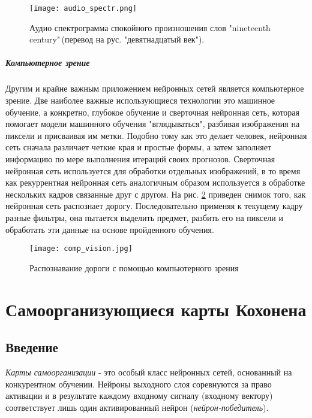 \documentclass[a4paper,12pt]{report}
\begin{document}
\begin{figure}[!htb]
    \centering
    \captionsetup{justification=centering}
    \texttt{[image: audio\_spectr.png]}
    \caption{Аудио спектрограмма спокойного произношения слов
    "nineteenth century"\,(перевод на рус. "девятнадцатый век").}
    \label{fig:audio_spectr}
\end{figure}


\paragraph{Компьютерное зрение}
Другим и крайне важным приложением нейронных сетей является
компьютерное зрение. Две наиболее важные использующиеся технологии это
машинное обучение, а конкретно, глубокое обучение и сверточная
нейронная сеть, которая помогает модели машинного обучения
"вглядываться", разбивая изображения на пиксели и присваивая им метки.
Подобно тому как это делает человек, нейронная сеть сначала различает
четкие края и простые формы, а затем заполняет информацию по мере
выполнения итераций своих прогнозов. Сверточная нейронная сеть
используется для обработки отдельных изображений, в то время как
рекуррентная нейронная сеть аналогичным образом используется в
обработке нескольких кадров связанные друг с другом. На рис.
\ref{fig:comp_vision}
приведен снимок того, как нейронная сеть распознает дорогу.
Последовательно применяя к текущему кадру разные фильтры, она пытается
выделить предмет, разбить его на пиксели и обработать эти данные на
основе пройденного обучения.

\begin{figure}[!htb]
    \centering
    \texttt{[image: comp\_vision.jpg]}
    \caption{Распознавание дороги с помощью компьютерного
    зрения}
    \label{fig:comp_vision}
\end{figure}

\chapter{Самоорганизующиеся карты Кохонена}
\section{Введение} \label{sec:SOM intro}
\textit{Карты самоорганизации} - это особый класс нейронных сетей,
основанный на конкурентном обучении. Нейроны выходного слоя
соревнуются за право активации и в результате каждому входному
сигналу (входному вектору) соответствует лишь один активированный
нейрон (\textit{нейрон-победитель}).
\end{document}
